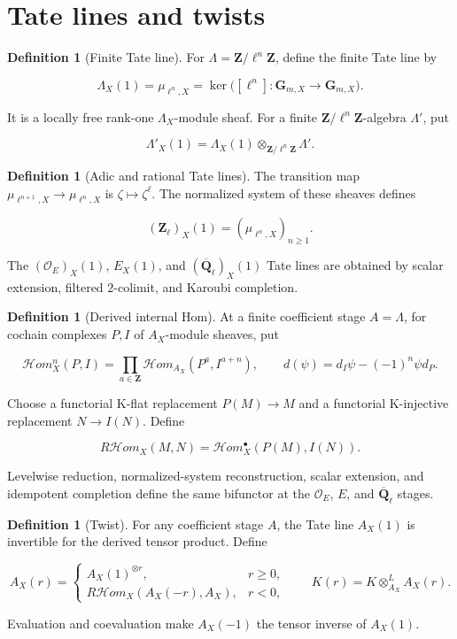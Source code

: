 \documentclass[10pt]{article}
\theoremstyle{definition}
\newtheorem{definition}[theorem]{Definition}
\newcommand{\Zl}{\mathbf Z_\ell}
\newcommand{\Qlb}{\overline{\mathbf Q}_\ell}
\newcommand{\OO}{\mathcal O}
\begin{document}
\section{Tate lines and twists}

\begin{definition}[Finite Tate line]
For \(\Lambda=\mathbf Z/\ell^n\mathbf Z\), define the finite Tate line by

\[
 \Lambda_X(1)=\mu_{\ell^n,X}
 =\ker\bigl([\ell^n]:\mathbf G_{m,X}\to\mathbf G_{m,X}\bigr).
\]

It is a locally free rank-one \(\Lambda_X\)-module sheaf.  For a finite
\(\mathbf Z/\ell^n\mathbf Z\)-algebra \(\Lambda'\), put

\[
 \Lambda'_X(1)=\Lambda_X(1)\otimes_{\mathbf Z/\ell^n\mathbf Z}\Lambda'.
\]
\end{definition}

\begin{definition}[Adic and rational Tate lines]
The transition map
\(\mu_{\ell^{n+1},X}\to\mu_{\ell^n,X}\) is
\(\zeta\mapsto\zeta^\ell\).  The normalized system of these sheaves defines

\[
 (\Zl)_X(1)=(\mu_{\ell^n,X})_{n\geq1}.
\]

The \((\OO_E)_X(1)\), \(E_X(1)\), and \((\Qlb)_X(1)\) Tate lines are obtained
by scalar extension, filtered \(2\)-colimit, and Karoubi completion.
\end{definition}

\begin{definition}[Derived internal Hom]
At a finite coefficient stage \(A=\Lambda\), for cochain complexes \(P,I\)
of \(A_X\)-module sheaves, put

\[
 \mathcal Hom_X^n(P,I)=
 \prod_{a\in\mathbf Z}\mathcal Hom_{A_X}(P^a,I^{a+n}),
 \qquad
 d(\psi)=d_I\psi-(-1)^n\psi d_P.
\]

Choose a functorial K-flat replacement \(P(M)\to M\) and a functorial
K-injective replacement \(N\to I(N)\).  Define

\[
 R\mathcal Hom_X(M,N)=
 \mathcal Hom_X^\bullet(P(M),I(N)).
\]

Levelwise reduction, normalized-system reconstruction, scalar extension,
and idempotent completion define the same bifunctor at the
\(\OO_E\), \(E\), and \(\Qlb\) stages.
\end{definition}

\begin{definition}[Twist]
For any coefficient stage \(A\), the Tate line \(A_X(1)\) is invertible for
the derived tensor product.  Define

\[
 A_X(r)=
 \begin{cases}
 A_X(1)^{\otimes r},&r\geq0,\\
 R\mathcal Hom_X(A_X(-r),A_X),&r<0,
 \end{cases}
 \qquad
 K(r)=K\otimes^L_{A_X}A_X(r).
\]

Evaluation and coevaluation make \(A_X(-1)\) the tensor inverse of
\(A_X(1)\).
\end{definition}
\end{document}
